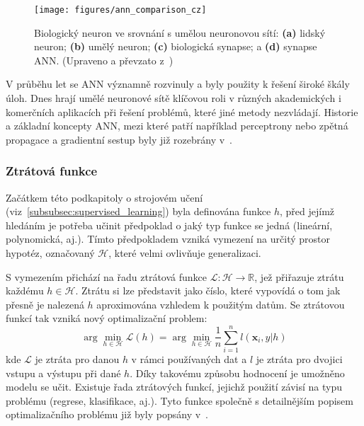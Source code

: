 \begin{figure}[!htb]
    \begin{center}
        \texttt{[image: figures/ann\_comparison\_cz]}
        \caption{Biologický neuron ve srovnání s umělou neuronovou sítí: \textbf{(a)}
            lidský neuron; \textbf{(b)} umělý neuron; \textbf{(c)} biologická
            synapse; a \textbf{(d)} synapse ANN. (Upraveno a převzato
            z~\cite{suzuki2013})}
        \label{fig:ann_comparison}
    \end{center}
\end{figure}

V průběhu let se \gls{ANN} významně rozvinuly a byly použity k řešení široké
škály úloh. Dnes hrají umělé neuronové sítě klíčovou roli v různých akademických
i komerčních aplikacích při řešení problémů, které jiné metody nezvládají.
Historie a základní koncepty \gls{ANN}, mezi které patří například perceptrony
nebo zpětná propagace a gradientní sestup byly již rozebrány
v~\cite{Aurelien2022,Murphy2012,Goodfellow2016}.

\subsubsection{Ztrátová funkce}
Začátkem této podkapitoly o strojovém učení
(viz~\ref{subsubsec:supervised_learning}) byla definována funkce $h$, před
jejímž hledáním je potřeba učinit předpoklad o jaký typ funkce se jedná
(lineární, polynomická, aj.). Tímto předpokladem vzniká vymezení na určitý
prostor hypotéz, označovaný $\mathcal{H}$, které velmi ovlivňuje generalizaci.

S vymezením přichází na řadu ztrátová funkce $\mathcal{L}:\mathcal{H}
    \rightarrow \mathbb{R}$, jež přiřazuje ztrátu každému $h \in \mathcal{H}$.
    Ztrátu si lze představit jako číslo, které vypovídá o tom jak přesně je
    nalezená $h$ aproximována vzhledem k použitým datům. Se ztrátovou funkcí tak
    vzniká nový optimalizační problem:
\begin{equation}
    \arg\min_{h \in \mathcal{H}} \mathcal{L}(h) = \arg\min_{h \in \mathcal{H}} \frac{1}{n}\sum_{i=1}^nl(\textbf{x}_i,y|h)
\end{equation}
kde $\mathcal{L}$ je ztráta pro danou $h$ v rámci používaných dat a $l$ je
ztráta pro dvojici vstupu a výstupu při dané $h$. Díky takovému způsobu
hodnocení je umožněno modelu se učit. Existuje řada ztrátových funkcí, jejichž
použití závisí na typu problému (regrese, klasifikace, aj.). Tyto funkce
společně s detailnějším popisem optimalizačního problému již byly popsány
v~\cite{Murphy2012}.

